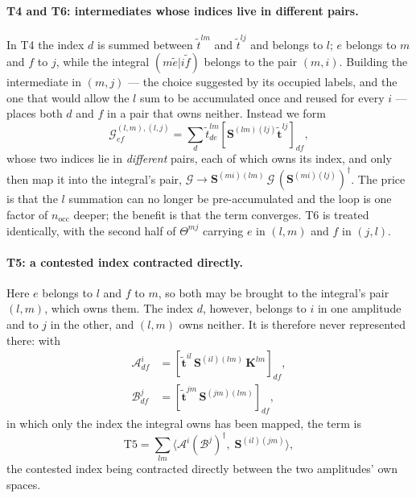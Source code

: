 \documentclass[aip,jcp,amsmath,amssymb,preprint,superscriptaddress]{revtex4-2}%
\newcommand{\pao}[1]{\tilde{#1}}
\begin{document}
\paragraph{T4 and T6: intermediates whose indices live in different pairs.}
In T4 the index $d$ is summed between $\tilde{t}^{lm}$ and $\tilde{t}^{lj}$
and belongs to $l$; $e$ belongs to $m$ and $f$ to $j$, while the integral
$(m\pao{e}|i\pao{f})$ belongs to the pair $(m,i)$. Building the intermediate
in $(m,j)$ --- the choice suggested by its occupied labels, and the one that
would allow the $l$ sum to be accumulated once and reused for every $i$ ---
places both $d$ and $f$ in a pair that owns neither. Instead we form
%
\begin{equation}
  \mathcal{G}^{(l,m),(l,j)}_{ef} = \sum_{d}
    \tilde{t}^{lm}_{de}\left[\mathbf{S}^{(lm)(lj)}\tilde{\mathbf{t}}^{lj}\right]_{df},
  \label{eq:t4}
\end{equation}
%
whose two indices lie in \emph{different} pairs, each of which owns its index,
and only then map it into the integral's pair,
$\mathcal{G} \rightarrow \mathbf{S}^{(mi)(lm)}\,\mathcal{G}\,
(\mathbf{S}^{(mi)(lj)})^{\dagger}$. The price is that the $l$ summation can no
longer be pre-accumulated and the loop is one factor of $n_{\text{occ}}$
deeper; the benefit is that the term converges. T6 is treated identically,
with the second half of $\Theta^{mj}$ carrying $e$ in $(l,m)$ and $f$ in
$(j,l)$.

\paragraph{T5: a contested index contracted directly.}
Here $e$ belongs to $l$ and $f$ to $m$, so both may be brought to the
integral's pair $(l,m)$, which owns them. The index $d$, however, belongs to
$i$ in one amplitude and to $j$ in the other, and $(l,m)$ owns neither. It is
therefore never represented there: with
%
\begin{align}
  \mathcal{A}^{i}_{df} &= \left[\tilde{\mathbf{t}}^{il}\,
     \mathbf{S}^{(il)(lm)}\,\mathbf{K}^{lm}\right]_{df}, \\
  \mathcal{B}^{j}_{df} &= \left[\tilde{\mathbf{t}}^{jm}\,
     \mathbf{S}^{(jm)(lm)}\right]_{df},
\end{align}
%
in which only the index the integral owns has been mapped, the term is
%
\begin{equation}
  \text{T5} = \sum_{lm}
    \Big\langle \mathcal{A}^{i}(\mathcal{B}^{j})^{\dagger},\;
                \mathbf{S}^{(il)(jm)}\Big\rangle,
  \label{eq:t5}
\end{equation}
%
the contested index being contracted directly between the two amplitudes'
own spaces.
\end{document}
